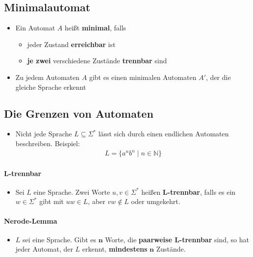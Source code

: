 \documentclass{scrartcl}
\begin{document}
\subsection{Minimalautomat}

\begin{itemize}
	\item Ein Automat $A$ heißt \textbf{minimal}, falls
	\begin{itemize}
		\item jeder Zustand \textbf{erreichbar} ist
		\item \textbf{je zwei} verschiedene Zustände \textbf{trennbar} sind
	\end{itemize}
	\item Zu jedem Automaten $A$ gibt es einen minimalen Automaten $A'$, der die gleiche Sprache erkennt
\end{itemize}

\subsection{Die Grenzen von Automaten}

\begin{itemize}
	\item Nicht jede Sprache $L \subseteq \Sigma^*$ lässt sich durch einen endlichen Automaten beschreiben. Beispiel:
	\begin{align*}
		L = \{ a^nb^n \mid n \in \mathbb{N} \}
	\end{align*}
\end{itemize}

\paragraph{L-trennbar}

\begin{itemize}
	\item Sei $L$ eine Sprache. Zwei Worte $u,v \in \Sigma^*$ heißen \textbf{L-trennbar}, falls es ein $w \in \Sigma^*$ gibt mit $uw \in L$, aber $vw \not \in L$ oder umgekehrt.
\end{itemize}

\paragraph{Nerode-Lemma}

\begin{itemize}
	\item $L$ sei eine Sprache. Gibt es $\mathbf{n}$ Worte, die \textbf{paarweise L-trennbar} sind, so hat jeder Automat, der $L$ erkennt, \textbf{mindestens} $\mathbf{n}$ Zustände.
\end{itemize}
\end{document}
